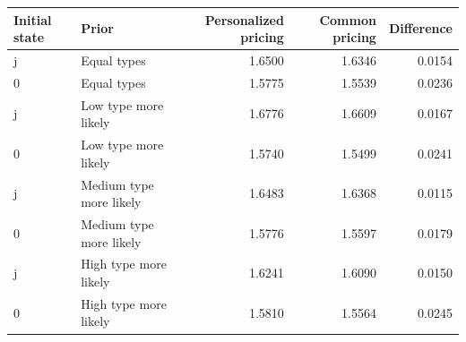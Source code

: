 \begin{tabular}{llrrr}\hline
Initial state & Prior & Personalized pricing & Common pricing & Difference\\\hline
j & Equal types & 1.6500 & 1.6346 & 0.0154 \\
0 & Equal types & 1.5775 & 1.5539 & 0.0236 \\
j & Low type more likely & 1.6776 & 1.6609 & 0.0167 \\
0 & Low type more likely & 1.5740 & 1.5499 & 0.0241 \\
j & Medium type more likely & 1.6483 & 1.6368 & 0.0115 \\
0 & Medium type more likely & 1.5776 & 1.5597 & 0.0179 \\
j & High type more likely & 1.6241 & 1.6090 & 0.0150 \\
0 & High type more likely & 1.5810 & 1.5564 & 0.0245 \\
\hline\end{tabular}
